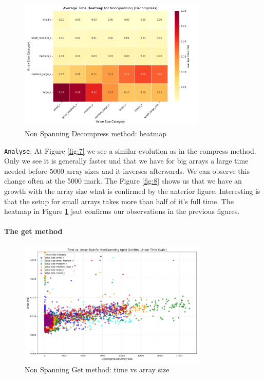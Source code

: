 \documentclass[11pt, a4paper]{article}
\begin{document}
	\begin{figure}[H]%
		\centering
		\includegraphics[width=0.8\textwidth]{Grafics/NonSpanning/NonSpanningDecompressHeat.png}
		\caption{Non Spanning Decompress method: heatmap}
		\label{fig:9}
	\end{figure}
	\texttt{Analyse}: At Figure \ref{fig:7} we see a similar evolution as in the compress method. Only we see it is generally faster und that we have for big arrays a large time needed before 5000 array sizes and it inverses afterwards. We can observe this change often at the 5000 mark.
	The Figure \ref{fig:8} shows us that we have an growth with the array size what is confirmed by the anterior figure. Interesting is that the setup for small arrays takes more than half of it's full time.
	The heatmap in Figure \ref{fig:9} jsut confirms our observations in the previous figures.
	  
	\paragraph{The get method}
	\begin{figure}[H]%
		\centering
		\includegraphics[width=0.8\textwidth]{Grafics/NonSpanning/NonSpanningGetTimevsSize.png}
		\caption{Non Spanning Get method: time vs array size}
		\label{fig:10}
		
	\end{figure}
	
\end{document}
